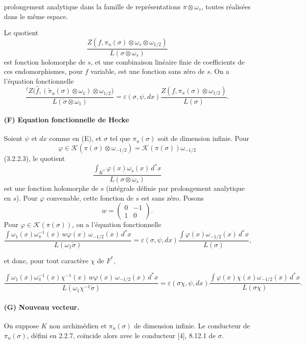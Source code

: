 \documentclass[10pt,a4paper]{article}
\providecommand{\cK}{\mathcal K}
\begin{document}
\clearpage
{}
\hypertarget{authority-44}{}
prolongement analytique dans la famille de représentations \(\pi\otimes\omega_s\), toutes réalisées dans le même espace.

Le quotient
\[
\frac{Z(f,\pi_u(\sigma)\otimes\omega_s\otimes\omega_{1/2})}
     {L(\sigma\otimes\omega_s)}
\]
est fonction holomorphe de \(s\), et une combinaison linéaire finie de coefficients de ces endomorphismes, pour \(f\) variable, est une fonction sans zéro de \(s\). On a l'équation fonctionnelle
\[
\frac{{}^{t}Z\bigl(\widehat f,(\check{\pi}_u(\sigma)\otimes\omega_1)\otimes\omega_{1/2}\bigr)}
     {L(\check\sigma\otimes\omega_1)}
=
\varepsilon(\sigma,\psi,dx)
\frac{Z(f,\pi_u(\sigma)\otimes\omega_{1/2})}{L(\sigma)}.
\]

\paragraph{(F) Equation fonctionnelle de Hecke} Soient \(\psi\) et \(dx\) comme en (E), et \(\sigma\) tel que \(\pi_u(\sigma)\) soit de dimension infinie. Pour
\[
\varphi\in\cK(\pi(\sigma)\otimes\omega_{-1/2})=
\cK(\pi(\sigma))\omega_{-1/2}
\]
(3.2.2.3), le quotient
\[
\frac{\displaystyle\int_{K^*}\varphi(x)\omega_s(x)\,d^*x}
     {L(\sigma\otimes\omega_s)}
\]
est une fonction holomorphe de \(s\) (intégrale définie par prolongement analytique en \(s\)). Pour \(\varphi\) convenable, cette fonction de \(s\) est sans zéro. Posons
\[
w=\begin{pmatrix}0&-1\\1&0\end{pmatrix}.
\]
Pour \(\varphi\in\cK(\pi(\sigma))\), on a l'équation fonctionnelle
\[
\frac{\displaystyle\int \omega_1(x)\omega_\pi^{-1}(x)\,w\varphi(x)\,\omega_{-1/2}(x)\,d^*x}
     {L(\omega_1\check\sigma)}
=
\varepsilon(\sigma,\psi,dx)
\frac{\displaystyle\int\varphi(x)\omega_{-1/2}(x)\,d^*x}{L(\sigma)},
\]

et donc, pour tout caractère \(\chi\) de \(F^*\),

\clearpage
{}
\hypertarget{authority-45}{}
\[
\frac{\displaystyle\int \omega_1(x)\omega_\pi^{-1}(x)\chi^{-1}(x)\,w\varphi(x)\,\omega_{-1/2}(x)\,d^*x}
     {L(\omega_1\chi^{-1}\check\sigma)}
=
\varepsilon(\sigma\chi,\psi,dx)
\frac{\displaystyle\int\varphi(x)\chi(x)\omega_{-1/2}(x)\,d^*x}{L(\sigma\chi)}.
\]

\paragraph{(G) Nouveau vecteur.} On suppose \(K\) non archimédien et \(\pi_u(\sigma)\) de dimension infinie. Le conducteur de \(\pi_u(\sigma)\), défini en 2.2.7, coïncide alors avec le conducteur [4], 8.12.1 de \(\sigma\).
\end{document}

